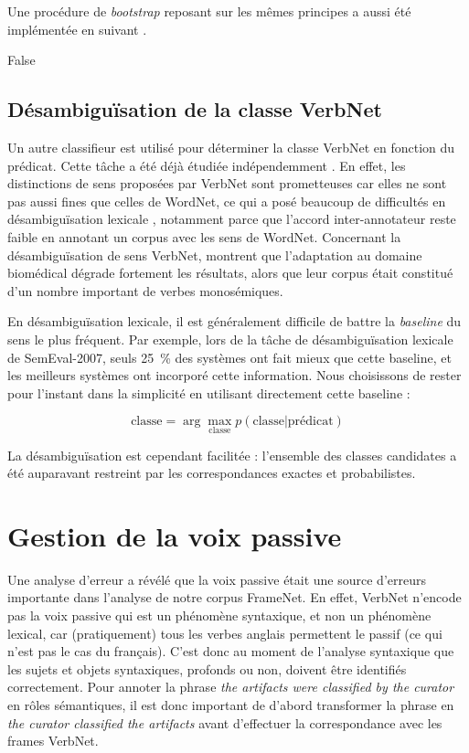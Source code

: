 Une procédure de \textit{bootstrap} reposant sur les mêmes principes a aussi
été implémentée en suivant \cite{swier2004unsupervised}.

\if False

\subsection{Désambiguïsation de la classe VerbNet}

Un autre classifieur est utilisé pour déterminer la classe VerbNet en fonction
du prédicat.  Cette tâche a été déjà étudiée indépendemment
\citep{abend2008supervised,brown2011verbnet,kawahara2014single}. En effet, les
distinctions de sens proposées par VerbNet sont prometteuses car elles ne sont
pas aussi fines que celles de WordNet, ce qui a posé beaucoup de difficultés en
désambiguïsation lexicale \citep[section 10.1]{navigli2009word}, notamment
parce que l'accord inter-annotateur reste faible en annotant un corpus avec les
sens de WordNet. Concernant la désambiguïsation de sens VerbNet,
\cite{abend2009unsupervised} montrent que l'adaptation au domaine biomédical
dégrade fortement les résultats, alors que leur corpus était constitué d'un
nombre important de verbes monosémiques.

En désambiguïsation lexicale, il est généralement difficile de battre la
\textit{baseline} du sens le plus fréquent. Par exemple, lors de la tâche de
désambiguïsation lexicale de SemEval-2007, seuls 25~\% des systèmes ont fait
mieux que cette baseline, et les meilleurs systèmes ont incorporé cette
information. Nous choisissons de rester pour l'instant dans la simplicité en
utilisant directement cette baseline :

$$ \text{classe} = \arg\max_{\text{classe}} p(\text{classe} \vert \text{prédicat}) $$

La désambiguïsation est cependant facilitée : l'ensemble des classes candidates
a été auparavant restreint par les correspondances exactes et probabilistes.

\fi

\section{Gestion de la voix passive}
\label{sec:passif}

Une analyse d'erreur a révélé que la voix passive était une source d'erreurs
importante dans l'analyse de notre corpus FrameNet. En effet, VerbNet n'encode
pas la voix passive qui est un phénomène syntaxique, et non un phénomène
lexical, car (pratiquement) tous les verbes anglais permettent le passif (ce
qui n'est pas le cas du français). C'est donc au moment de l'analyse syntaxique
que les sujets et objets syntaxiques, profonds ou non, doivent être identifiés
correctement. Pour annoter la phrase \textit{the artifacts were classified by the
curator} en rôles sémantiques, il est donc important de d'abord transformer la
phrase en \textit{the curator classified the artifacts} avant d'effectuer la
correspondance avec les frames VerbNet.

